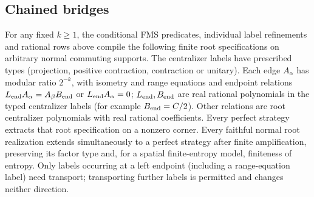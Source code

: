 \subsection{Chained bridges}
\begin{lemma}\label{lem:chain}
For any fixed $k\geq1$, the conditional FMS predicates, individual
label refinements and rational rows above compile the following
finite root specifications on arbitrary normal commuting supports.
The centralizer labels have prescribed types (projection, positive
contraction, contraction or unitary). Each edge $A_\alpha$ has modular
ratio $2^{-k}$, with isometry and range equations and endpoint
relations $L_{\rm end}A_\alpha=A_\beta B_{\rm end}$ or $L_{\rm end}A_\alpha=0$; $L_{\rm end},B_{\rm end}$ are real rational
polynomials in the typed centralizer labels (for example $B_{\rm end}=C/2$). Other relations are root
centralizer polynomials with real rational coefficients.
Every perfect strategy extracts that root specification on a
nonzero corner. Every faithful normal root realization extends
simultaneously to a perfect strategy after finite amplification,
preserving its factor type and, for a spatial finite-entropy model,
finiteness of entropy. Only labels occurring at a left endpoint (including a range-equation
label) need transport; transporting further labels is permitted and
changes neither direction.
\end{lemma}
